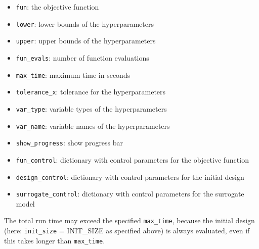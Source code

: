 \documentclass[
  letterpaper,
  DIV=11,
  numbers=noendperiod]{scrreprt}
\providecommand{\tightlist}{%
  \setlength{\itemsep}{0pt}\setlength{\parskip}{0pt}}\usepackage{longtable,booktabs,array}
\begin{document}
\begin{itemize}
\tightlist
\item
  \texttt{fun}: the objective function
\item
  \texttt{lower}: lower bounds of the hyperparameters
\item
  \texttt{upper}: upper bounds of the hyperparameters
\item
  \texttt{fun\_evals}: number of function evaluations
\item
  \texttt{max\_time}: maximum time in seconds
\item
  \texttt{tolerance\_x}: tolerance for the hyperparameters
\item
  \texttt{var\_type}: variable types of the hyperparameters
\item
  \texttt{var\_name}: variable names of the hyperparameters
\item
  \texttt{show\_progress}: show progress bar
\item
  \texttt{fun\_control}: dictionary with control parameters for the
  objective function
\item
  \texttt{design\_control}: dictionary with control parameters for the
  initial design
\item
  \texttt{surrogate\_control}: dictionary with control parameters for
  the surrogate model
\end{itemize}

\begin{tcolorbox}[enhanced jigsaw, left=2mm, toprule=.15mm, colframe=quarto-callout-note-color-frame, leftrule=.75mm, title=\textcolor{quarto-callout-note-color}{\faInfo}\hspace{0.5em}{Note: Total run time}, toptitle=1mm, opacitybacktitle=0.6, arc=.35mm, titlerule=0mm, opacityback=0, bottomtitle=1mm, coltitle=black, rightrule=.15mm, colback=white, colbacktitle=quarto-callout-note-color!10!white, breakable, bottomrule=.15mm]

The total run time may exceed the specified \texttt{max\_time}, because
the initial design (here: \texttt{init\_size} = INIT\_SIZE as specified
above) is always evaluated, even if this takes longer than
\texttt{max\_time}.

\end{tcolorbox}
\end{document}
